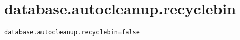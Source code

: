 \section{database.autocleanup.recyclebin}
\label{configuration:DatabaseAutocleanupRecyclebin}
\ClearAPI
\TODO
{}
\begin{lstlisting}[style=Props,caption={Usage example for \textit{database.autocleanup.recyclebin}}]
database.autocleanup.recyclebin=false
\end{lstlisting}